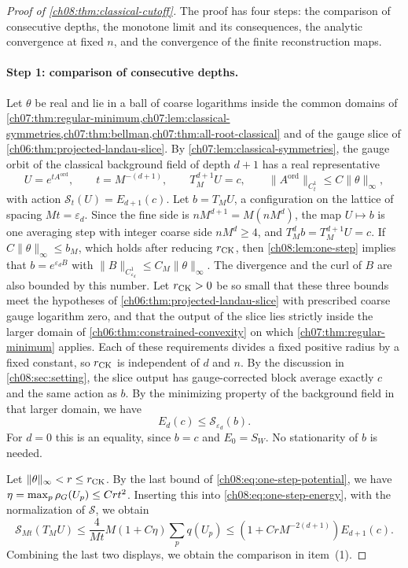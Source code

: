 \begin{proof}[Proof of \cref{ch08:thm:classical-cutoff}]
The proof has four steps: the comparison of consecutive depths, the monotone limit and its consequences, the analytic convergence at fixed $n$, and the convergence of the finite reconstruction maps.

\paragraph{Step 1: comparison of consecutive depths.}
Let $\theta$ be real and lie in a ball of coarse logarithms inside the common domains of \cref{ch07:thm:regular-minimum,ch07:lem:classical-symmetries,ch07:thm:bellman,ch07:thm:all-root-classical} and of the gauge slice of \cref{ch06:thm:projected-landau-slice}. By \cref{ch07:lem:classical-symmetries}, the gauge orbit of the classical background field of depth $d+1$ has a real representative
\[
 U=e^{tA^{\mathrm{ord}}},\qquad t=M^{-(d+1)},\qquad
 T_M^{d+1}U=c,\qquad
 \|A^{\mathrm{ord}}\|_{C^1_t}\le C\|\theta\|_\infty,
\]
with action $\mathscr S_t(U)=E_{d+1}(c)$. Let $b=T_MU$, a configuration on the lattice of spacing $Mt=\varepsilon_d$. Since the fine side is $nM^{d+1}=M(nM^d)$, the map $U\mapsto b$ is one averaging step with integer coarse side $nM^d\ge4$, and $T_M^db=T_M^{d+1}U=c$. If $C\|\theta\|_\infty\le b_M$, which holds after reducing $r_{\rm CK}$, then \cref{ch08:lem:one-step} implies that $b=e^{\varepsilon_dB}$ with $\|B\|_{C^1_{\varepsilon_d}}\le C_M\|\theta\|_\infty$. The divergence and the curl of $B$ are also bounded by this number. Let $r_{\rm CK}>0$ be so small that these three bounds meet the hypotheses of \cref{ch06:thm:projected-landau-slice} with prescribed coarse gauge logarithm zero, and that the output of the slice lies strictly inside the larger domain of \cref{ch06:thm:constrained-convexity} on which \cref{ch07:thm:regular-minimum} applies. Each of these requirements divides a fixed positive radius by a fixed constant, so $r_{\rm CK}$ is independent of $d$ and $n$. By the discussion in \cref{ch08:sec:setting}, the slice output has gauge-corrected block average exactly $c$ and the same action as $b$. By the minimizing property of the background field in that larger domain, we have
\[
 E_d(c)\le\mathscr S_{\varepsilon_d}(b).
\]
For $d=0$ this is an equality, since $b=c$ and $E_0=S_W$. No stationarity of $b$ is needed.

Let $\|\theta\|_\infty<r\le r_{\rm CK}$. By the last bound of \eqref{ch08:eq:one-step-potential}, we have $\eta=\max_p\rho_G(U_p)\le Crt^2$. Inserting this into \eqref{ch08:eq:one-step-energy}, with the normalization of $\mathscr S$, we obtain
\[
 \mathscr S_{Mt}(T_MU)
 \le\frac4{Mt}M(1+C\eta)\sum_pq(U_p)
 \le(1+CrM^{-2(d+1)})E_{d+1}(c).
\]
Combining the last two displays, we obtain the comparison in item~(1).


\end{proof}
